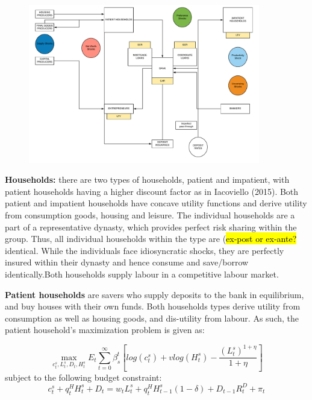 \documentclass[12pt]{article}
\numberwithin{equation}{section}
\begin{document}
\begin{figure}[H]
	
\includegraphics[width=0.9\textwidth]{3d_model_overview.pdf}
\end{figure}

\noindent
\textbf{Households:} there are two types of households, patient and impatient, with patient households having a higher discount factor as in Iacoviello (2015). Both patient and impatient households have concave utility functions and derive utility from consumption goods, housing and leisure. The individual households are a part of a representative dynasty, which provides perfect risk sharing within the group. Thus, all individual households within the type are (\hl{ex-post or ex-ante?} identical. While the individuals face idiosyncratic shocks, they are perfectly insured within their dynasty and hence consume and save/borrow identically.Both households supply labour in a competitive labour market.

\noindent
\textbf{Patient households} are savers who supply deposits to the bank in equilibrium, and buy houses with their own funds. Both households types derive utility from consumption as well as housing goods, and dis-utility from labour. As such, the patient household's maximization problem is given as:

\begin{equation}
\max_{c^s_t,L^s_t,D_{t},H^s_t}E_t\sum _{t=0}^{\infty } \beta_{s}^t [log(c^s_t)+vlog(H^s_t)-\frac{(L^s_t)^{1+\eta}}{1+\eta} ]
\end{equation}
subject to the following budget constraint: 
\begin{equation}
c^s_t+q^H_{t}H^s_{t} +{D_{t}}=w_{t}L^s_{t}+q^H_{t}H^s_{t-1}(1-\delta)+{D_{t-1}}R^D_{t}+\pi_{t}
\end{equation}
\end{document}
